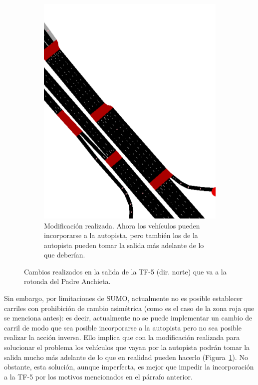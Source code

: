 \begin{figure}[ht]
\begin{subfigure}[t]{0.48\textwidth}
      \includegraphics[width=\textwidth]{report/images/netedit.-tf5-norte-bien.png}
      \caption{Modificación realizada. Ahora los vehículos pueden incorporarse a la autopista, pero también los de la autopista pueden tomar la salida más adelante de lo que deberían.}
      \label{fig:netedit-tf5-norte-bien}
    \end{subfigure}%
    \caption{Cambios realizados en la salida de la TF-5 (dir. norte) que va a la rotonda del Padre Anchieta.}
    \label{fig:netedit-tf5-problema}
\end{figure}

Sin embargo, por limitaciones de SUMO, actualmente no es posible establecer carriles con prohibición de cambio asimétrica (como es el caso de la zona roja que se menciona antes): es decir, actualmente no se puede implementar un cambio de carril de modo que sea posible incorporarse a la autopista pero no sea posible realizar la acción inversa. Ello implica que con la modificación realizada para solucionar el problema los vehículos que vayan por la autopista podrán tomar la salida mucho más adelante de lo que en realidad pueden hacerlo (Figura~\ref{fig:netedit-tf5-norte-bien}). No obstante, esta solución, aunque imperfecta, es mejor que impedir la incorporación a la TF-5 por los motivos mencionados en el párrafo anterior.

